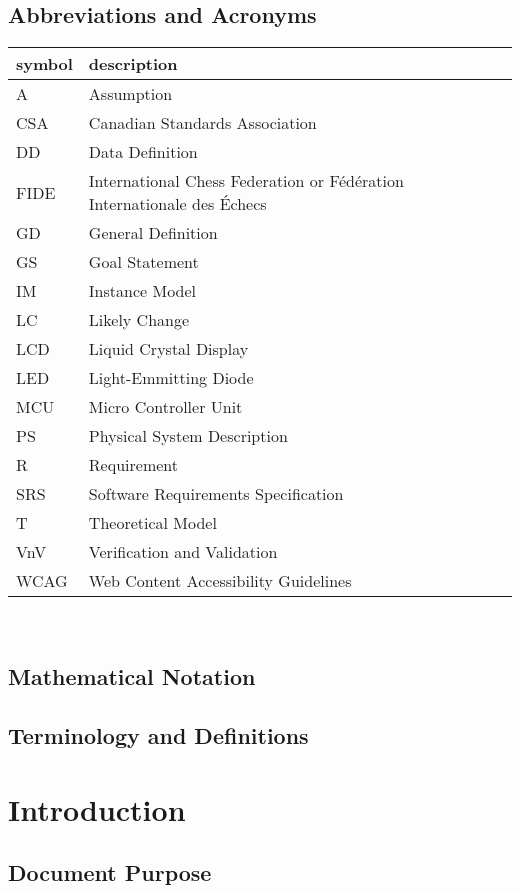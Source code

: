 \documentclass[12pt]{article}
\begin{document}
\newpage

\subsection{Abbreviations and Acronyms}
\begin{tabular}{l l} 
  \toprule		
  \textbf{symbol} & \textbf{description}\\
  \midrule 
  A & Assumption\\
  CSA & Canadian Standards Association\\
  DD & Data Definition\\
  FIDE & International Chess Federation or Fédération Internationale des Échecs\\
  GD & General Definition\\
  GS & Goal Statement\\
  IM & Instance Model\\
  LC & Likely Change\\
  LCD & Liquid Crystal Display\\
  LED & Light-Emmitting Diode\\
  MCU & Micro Controller Unit\\
  PS & Physical System Description\\
  R & Requirement\\
  SRS & Software Requirements Specification\\
  T & Theoretical Model\\
  VnV & Verification and Validation\\
  WCAG & Web Content Accessibility Guidelines\\
  \bottomrule
\end{tabular}\\

\subsection{Mathematical Notation}

\subsection{Terminology and  Definitions}

\section{Introduction}
\subsection{Document Purpose}
\end{document}
